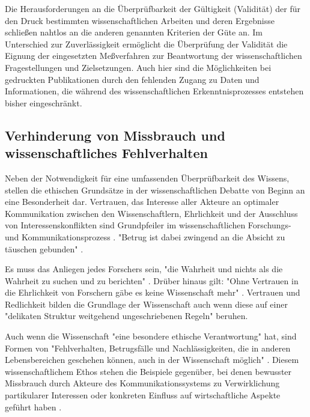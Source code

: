 Die Herausforderungen an die Überprüfbarkeit der Gültigkeit (Validität) der für den Druck bestimmten wissenschaftlichen Arbeiten und deren Ergebnisse schließen nahtlos an die anderen genannten Kriterien der Güte an. Im Unterschied zur Zuverlässigkeit ermöglicht die Überprüfung der Validität die Eignung der eingesetzten Meßverfahren zur Beantwortung der wissenschaftlichen Fragestellungen und Zielsetzungen. Auch hier sind die Möglichkeiten bei gedruckten Publikationen durch den fehlenden Zugang zu Daten und Informationen, die während des wissenschaftlichen Erkenntnisprozesses entstehen bisher eingeschränkt.

\subsection{Verhinderung von Missbrauch und wissenschaftliches Fehlverhalten}

Neben der Notwendigkeit für eine umfassenden Überprüfbarkeit des Wissens, stellen die ethischen Grundsätze in der wissenschaftlichen Debatte von Beginn an eine Besonderheit dar. Vertrauen, das Interesse aller Akteure an optimaler Kommunikation zwischen den Wissenschaftlern, Ehrlichkeit und der Ausschluss von Interessenskonflikten sind Grundpfeiler im wissenschaftlichen Forschungs- und Kommunikationsprozess \cite{Bargheer_2015} \cite{Wissenschaftsrat_2015}. "Betrug ist dabei zwingend an die Absicht zu täuschen gebunden" \cite{Luescher_2014}.

Es muss das Anliegen jedes Forschers sein, "die Wahrheit und nichts als die Wahrheit zu suchen und zu berichten" \cite{Luescher_2014}. Drüber hinaus gilt: "Ohne Vertrauen in die Ehrlichkeit von Forschern gäbe es keine Wissenschaft mehr" \cite[:18]{Hagner_2015}. Vertrauen und Redlichkeit bilden die Grundlage der Wissenschaft \cite{Bargheer_2015} auch wenn diese auf einer "delikaten Struktur weitgehend ungeschriebenen Regeln" \cite{Grand_2012} beruhen.

Auch wenn die Wissenschaft "eine besondere ethische Verantwortung" hat, sind Formen von "Fehlverhalten, Betrugsfälle und Nachlässigkeiten, die in anderen Lebensbereichen geschehen können, auch in der Wissenschaft möglich" \cite{Wissenschaftsrat_2015}. Diesem wissenschaftlichem Ethos stehen die Beispiele gegenüber, bei denen bewusster Missbrauch durch Akteure des Kommunikationssystems zu Verwirklichung partikularer Interessen oder konkreten Einfluss auf wirtschaftliche Aspekte geführt haben \cite{Luescher_2014} \cite{Binswanger_2014} \cite{Beall_2012}.

